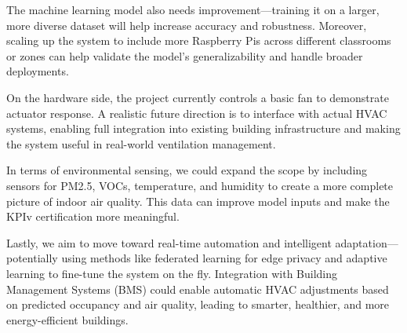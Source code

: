 The machine learning model also needs improvement—training it on a larger, more diverse dataset will help increase accuracy and robustness. Moreover, scaling up the system to include more Raspberry Pis across different classrooms or zones can help validate the model’s generalizability and handle broader deployments.

On the hardware side, the project currently controls a basic fan to demonstrate actuator response. A realistic future direction is to interface with actual HVAC systems, enabling full integration into existing building infrastructure and making the system useful in real-world ventilation management.

In terms of environmental sensing, we could expand the scope by including sensors for PM2.5, VOCs, temperature, and humidity to create a more complete picture of indoor air quality. This data can improve model inputs and make the KPIv certification more meaningful.

Lastly, we aim to move toward real-time automation and intelligent adaptation—potentially using methods like federated learning for edge privacy and adaptive learning to fine-tune the system on the fly. Integration with Building Management Systems (BMS) could enable automatic HVAC adjustments based on predicted occupancy and air quality, leading to smarter, healthier, and more energy-efficient buildings.